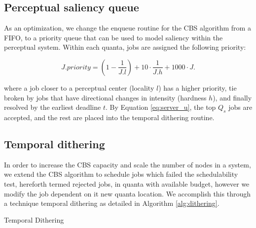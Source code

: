 \documentclass{sigchi}
\begin{document}
  \subsection{Perceptual saliency queue}
  As an optimization, we change the enqueue routine for the CBS algorithm from a FIFO, to a priority queue that can be used to model saliency within the perceptual system. Within each quanta, jobs are assigned the following priority:

  $$ J.priority =  (1 - \frac{1}{J.l}) + 10 \cdot \frac{1}{J.h} + 1000 \cdot J.$$

  where a job closer to a perceptual center (locality $l$) has a higher priority, tie broken by jobs that have directional changes in intensity (hardness $h$), and finally resolved by the earliest deadline $t$. By Equation \ref{eq:server_u}, the top $Q_s$ jobs are accepted, and the rest are placed into the temporal dithering routine. 

  \subsection{Temporal dithering}
  In order to increase the CBS capacity and scale the number of nodes in a system, we extend the CBS algorithm to schedule jobs which failed the schedulability test, hereforth termed rejected jobs, in quanta with available budget, however we modify the job dependent on it new quanta location. We accomplish this through a technique temporal dithering as detailed in Algorithm \ref{alg:dithering}. 

  

\begin{algorithm}


 \caption{Temporal Dithering}
 \label{alg:dithering}
\end{algorithm}





 
\end{document}
